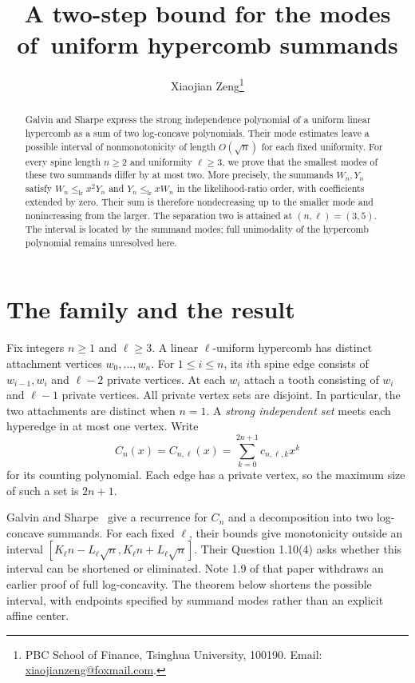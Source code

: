 \documentclass[11pt]{article}
\title{A two-step bound for the modes of\ uniform hypercomb summands}
\author{Xiaojian Zeng\thanks{PBC School of Finance, Tsinghua University, 100190.\newline
Email: \href{mailto:xiaojianzeng@foxmail.com}{xiaojianzeng@foxmail.com}.}}
\date{}
\begin{document}
\maketitle
\begin{abstract}
Galvin and Sharpe express the strong independence polynomial of a uniform
linear hypercomb as a sum of two log-concave polynomials. Their mode estimates
leave a possible interval of nonmonotonicity of length $O(\sqrt n)$ for each
fixed uniformity. For every spine length $n\geq2$ and uniformity $\ell\geq3$,
we prove that the smallest modes of these two summands differ by at most two.
More precisely, the summands $W_n,Y_n$ satisfy
$W_n\leq_{\mathrm{lr}}x^2Y_n$ and $Y_n\leq_{\mathrm{lr}}xW_n$ in the
likelihood-ratio order, with coefficients extended by zero.
Their sum is therefore nondecreasing up to the smaller mode and
nonincreasing from the larger. The separation two is attained at
$(n,\ell)=(3,5)$. The interval is located by the summand modes; full
unimodality of the hypercomb polynomial remains unresolved here.
\end{abstract}

\section{The family and the result}

Fix integers $n\geq1$ and $\ell\geq3$. A linear $\ell$-uniform hypercomb
has distinct attachment vertices $w_0,\ldots,w_n$. For $1\leq i\leq n$,
its $i$th spine edge consists of $w_{i-1},w_i$ and $\ell-2$ private vertices.
At each $w_i$ attach a tooth consisting of $w_i$ and $\ell-1$ private
vertices. All private vertex sets are disjoint. In particular, the two
attachments are distinct when $n=1$. A \emph{strong independent set}
meets each hyperedge in at most one vertex. Write
\[
 C_n(x)=C_{n,\ell}(x)=\sum_{k=0}^{2n+1}c_{n,\ell,k}x^k
\]
for its counting polynomial. Each edge has a private vertex, so the maximum
size of such a set is $2n+1$.

Galvin and Sharpe~\cite[Theorem 1.7, Corollary 1.8 and Section 2.5]{GS}
give a recurrence for $C_n$ and a decomposition into two log-concave
summands. For each fixed $\ell$, their bounds give monotonicity outside
an interval $[K_\ell n-L_\ell\sqrt n,K_\ell n+L_\ell\sqrt n]$.
Their Question 1.10(4) asks whether this interval can be shortened or
eliminated. Note 1.9 of that paper withdraws an earlier proof of full
log-concavity. The theorem below shortens the possible interval, with
endpoints specified by summand modes rather than an explicit affine center.
\end{document}
